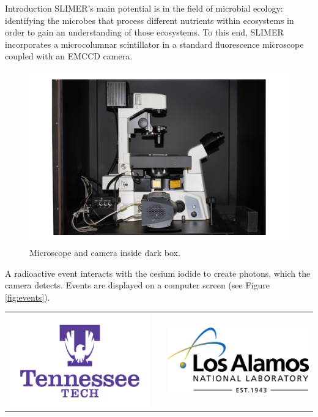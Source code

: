 \documentclass[final]{beamer}
\newlength{\onecolwid}
\begin{document}
\begin{frame}[t]
\begin{columns}[t]
\begin{column}{\onecolwid}
\begin{block}{Introduction}
SLIMER's main potential is in the field of microbial ecology: identifying the microbes that process different nutrients within ecosystems in order to gain an understanding of those ecosystems. To this end, SLIMER incorporates a microcolumnar scintillator in a standard fluorescence microscope coupled with an EMCCD camera.

\hspace{1cm}

\begin{figure}
\includegraphics[width=\linewidth]{detector2.png}
\caption{Microscope and camera inside dark box.}
\end{figure}

A radioactive event interacts with the cesium iodide to create photons, which the camera detects. Events are displayed on a computer screen (see Figure \ref{fig:events}). 

\end{block}

\begin{center}
\begin{tabular}{ccc}
\includegraphics[width=0.3\linewidth]{TTU.png} & \hspace{3cm} & \includegraphics[width=0.3\linewidth]{lanl.png}
\end{tabular}
\end{center}


\end{column}
\end{columns}
\end{frame}
\end{document}
